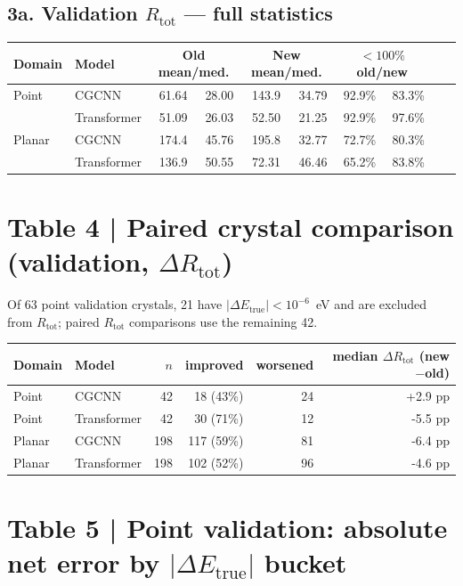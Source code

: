 \documentclass[11pt,a4paper]{article}
\begin{document}
\subsection*{3a. Validation $R_{\mathrm{tot}}$ --- full statistics}

\begin{center}
\footnotesize
\begin{tabular}{ll rr rr rr rr}
  \toprule
  Domain & Model & \multicolumn{2}{c}{Old mean/med.} & \multicolumn{2}{c}{New mean/med.} & \multicolumn{2}{c}{$<100\%$ old/new} \\
  \midrule
  Point  & CGCNN & 61.64 & 28.00 & 143.9 & 34.79 & 92.9\% & 83.3\% \\
  & Transformer & 51.09 & 26.03 & 52.50 & 21.25 & 92.9\% & 97.6\% \\
  Planar & CGCNN & 174.4 & 45.76 & 195.8 & 32.77 & 72.7\% & 80.3\% \\
  & Transformer & 136.9 & 50.55 & 72.31 & 46.46 & 65.2\% & 83.8\% \\
  \bottomrule
\end{tabular}
\end{center}

\section*{Table 4 | Paired crystal comparison (validation, $\Delta R_{\mathrm{tot}}$)}

\noindent Of 63 point validation crystals, 21 have $|\Delta E_{\mathrm{true}}|<10^{-6}$~eV and are excluded from $R_{\mathrm{tot}}$; paired $R_{\mathrm{tot}}$ comparisons use the remaining 42.

\begin{center}
\small
\begin{tabular}{llrrrr}
  \toprule
  Domain & Model & $n$ & improved & worsened & median $\Delta R_{\mathrm{tot}}$ (new$-$old) \\
  \midrule
  Point  & CGCNN & 42 & 18 (43\%) & 24 & +2.9 pp \\
  Point  & Transformer & 42 & 30 (71\%) & 12 & -5.5 pp \\
  Planar & CGCNN & 198 & 117 (59\%) & 81 & -6.4 pp \\
  Planar & Transformer & 198 & 102 (52\%) & 96 & -4.6 pp \\
  \bottomrule
\end{tabular}
\end{center}

\section*{Table 5 | Point validation: absolute net error by $|\Delta E_{\mathrm{true}}|$ bucket}
\end{document}
